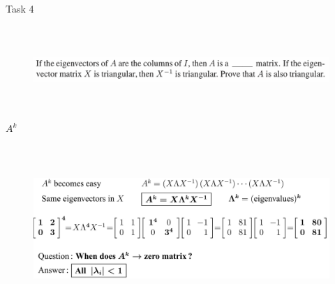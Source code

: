 \documentclass[aspectratio=169]{beamer}
\begin{document}

\begin{frame}[t]{Task 4}
    \framesubtitle{}
    \vspace{-0.5cm}
    \begin{figure}[H]
        \centering\includegraphics[height=3cm,width=1\textwidth,keepaspectratio]{4.png}
        \label{fig:4.png}
    \end{figure}
\end{frame}

\begin{frame}[t]{$A^k$}
\framesubtitle{}
    \begin{figure}[H]
        \centering\includegraphics[height=6cm,width=1\textwidth,keepaspectratio]{Power.png}
        \label{fig:Power.png}
    \end{figure}
\end{frame}
\end{document}
